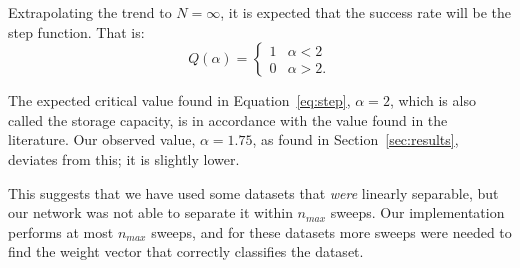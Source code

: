 Extrapolating the trend to \(N=\infty\), it is expected that the success rate will be the step function.
That is:
\begin{equation} \label{eq:step}
	Q(\alpha) =
	\begin{cases}
	    1 & \alpha < 2\\
	    0 & \alpha > 2\text{.}
	\end{cases}
\end{equation}

 The expected critical value found in Equation~\ref{eq:step}, \(\alpha=2\), which is also called the storage capacity, is in accordance with the value found in the literature\cite{perceptron_slides2}.
 Our observed value, \(\alpha = 1.75\), as found in Section~\ref{sec:results}, deviates from this; it is slightly lower.
 
 This suggests that we have used some datasets that \emph{were} linearly separable, but our network was not able to separate it within \(n_{max}\) sweeps.
 Our implementation performs at most \(n_{max}\) sweeps, and for these datasets more sweeps were needed to find the weight vector that correctly classifies the dataset.